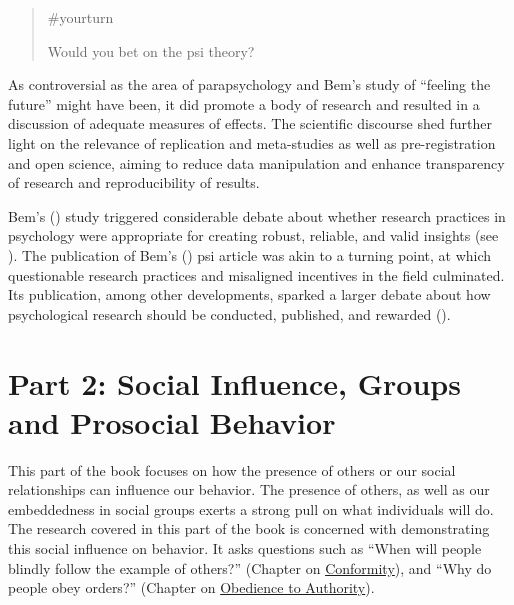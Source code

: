 \documentclass[
  letterpaper,
]{book}
\begin{document}
\begin{quote}
{\#yourturn}

Would you bet on the psi theory?
\end{quote}

As controversial as the area of parapsychology and Bem's study of
``feeling the future'' might have been, it did promote a body of
research and resulted in a discussion of adequate measures of effects.
The scientific discourse shed further light on the relevance of
replication and meta-studies as well as pre-registration and open
science, aiming to reduce data manipulation and enhance transparency of
research and reproducibility of results.

Bem's () study triggered
considerable debate about whether research practices in psychology were
appropriate for creating robust, reliable, and valid insights (see
). The publication of Bem's
() psi article was akin to a
turning point, at which questionable research practices and misaligned
incentives in the field culminated. Its publication, among other
developments, sparked a larger debate about how psychological research
should be conducted, published, and rewarded
().


\chapter*{\texorpdfstring{{Part 2: Social Influence, Groups and
Prosocial
Behavior}}{Part 2: Social Influence, Groups and Prosocial Behavior}}\label{part-2-social-influence-groups-and-prosocial-behavior}


This part of the book focuses on how the presence of others or our
social relationships can influence our behavior. The presence of others,
as well as our embeddedness in social groups exerts a strong pull on
what individuals will do. The research covered in this part of the book
is concerned with demonstrating this social influence on behavior. It
asks questions such as ``When will people blindly follow the example of
others?'' (Chapter on \href{chapter21.qmd}{Conformity}), and ``Why do
people obey orders?'' (Chapter on \href{chapter4.qmd}{Obedience to
Authority}).
\end{document}
